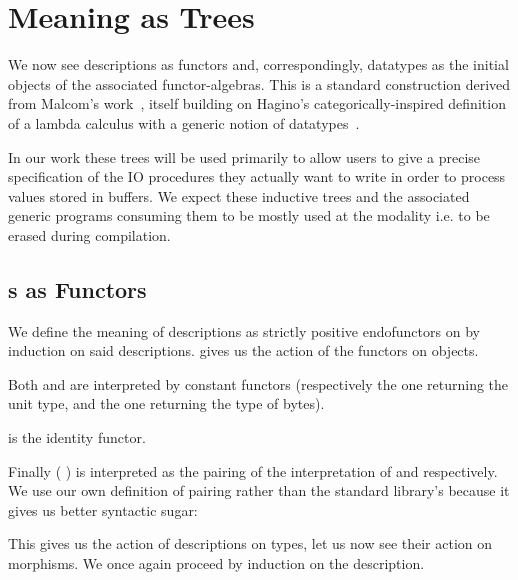 \section{Meaning as Trees}\label{sec:trees}

We now see descriptions as functors and, correspondingly,
datatypes as the initial objects of the associated functor-algebras.
%
This is a standard construction derived from Malcom's
work~\cite{DBLP:journals/scp/Malcolm90},
itself building on Hagino's categorically-inspired
definition of a lambda calculus
with a generic notion of datatypes~\cite{DBLP:conf/ctcs/Hagino87}.

In our work these trees will be used primarily to allow users to
give a precise specification of the IO procedures they actually want
to write in order to process values stored in buffers.
%
We expect these inductive trees and the associated generic programs
consuming them to be mostly used at the 
modality i.e. to be erased during compilation.

\subsection{s as Functors}

We define the meaning of descriptions as strictly positive
endofunctors on  by induction on said descriptions.
%
 gives us the action of the functors on objects.


Both  and  are interpreted by constant
functors (respectively the one returning the unit type, and the one returning
the type of bytes).

 is the identity functor.


Finally (  )
is interpreted as the pairing of the interpretation of
 and  respectively.
We use our own definition of pairing rather than the
standard library's because it gives us better syntactic sugar:


This gives us the action of descriptions on types, let us now
see their action on morphisms.
%
We once again proceed by induction on the description.


